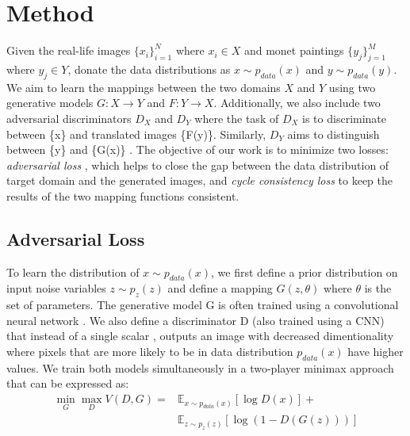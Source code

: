 \documentclass[10pt,twocolumn,letterpaper]{article}
\begin{document}
\section{Method}
Given the real-life images $\{x_i\}_{i=1}^N$ where $x_{i}\in X$ and monet paintings $\{y_j\}_{j=1}^M$ where $y_{j}\in Y$, donate the data distributions as $x \sim p_{data}(x)$ and $y \sim p_{data}(y)$. We aim to learn the mappings between the two domains $X$ and $Y$ using two generative models $G : X \longrightarrow Y$ and $F : Y \longrightarrow X$. Additionally, we also include two adversarial discriminators $D_{X}$ and $D_{Y}$ where the task of $D_{X}$ is to discriminate between \{x\} and translated images \{F(y)\}. Similarly, $D_{Y}$ aims to distinguish between \{y\} and \{G(x)\} \cite{cyclegan}. The objective of our work is to minimize two losses: \emph{adversarial loss} \cite{simplegan}, which helps to close the gap between the data distribution of target domain and the generated images, and \emph{cycle consistency loss} to keep the results of the two mapping functions consistent.

\subsection{Adversarial Loss}
To learn the distribution of $x \sim p_{data}(x)$, we first define a prior distribution on input noise variables $z \sim p_{z}(z)$ and define a mapping $G(z,\theta)$ where $\theta$ is the set of parameters. The generative model G is often trained using a convolutional neural network \cite{cnn}. We also define a discriminator D (also trained using a CNN) that instead of a single scalar \cite{simplegan}, outputs an image with decreased dimentionality where pixels that are more likely to be in data distribution $p_{data}(x)$ have higher values. We train both models simultaneously in a two-player minimax approach that can be expressed as:
\begin{equation}
	\begin{split}
		\min_G \max_D V(D,G) = &\mathbb{E}_{x \sim p_{data}(x)}[\log{D(x)}]+ \\
		&\mathbb{E}_{z \sim p_{z}(z)}[\log{(1-D(G(z)))}]
	\end{split}
\end{equation}
\end{document}
